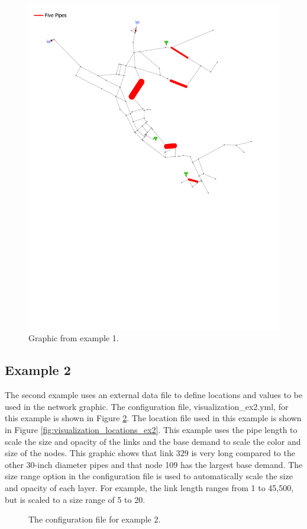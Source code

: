 \begin{figure}[h]
  \centering
  \includegraphics[scale=0.80]{examples/visualization_ex1.pdf}
  \caption{Graphic from  example 1.}
  \label{fig:visualization_graphic_ex1}
\end{figure}

\FloatBarrier 
\subsection{Example 2}

The second example uses an external data file to define locations and values to
be used in the network graphic.
The configuration file, visualization\_ex2.yml, for this example is shown in Figure \ref{fig:visualization_ex2}.  
The location file used in this example is shown in Figure \ref{fig:visualization_locations_ex2}. 
This example uses the pipe length to scale the size and opacity of the links and 
the base demand to scale the color and size of the nodes. This graphic 
shows that link 329 is very long compared to the other 30-inch diameter pipes and 
that node 109 has the largest base demand. The size range option in the configuration file   
is used to automatically scale the size and opacity of each layer. For example, 
the link length ranges from 1 to 45,500, but is scaled to a size range of 5 to 20.   
\begin{figure}[h]
  \caption{The  configuration file for example 2.}
  \label{fig:visualization_ex2}
\end{figure}

